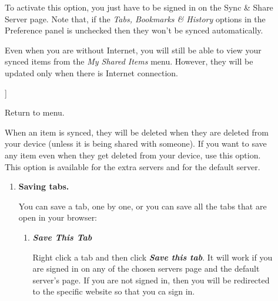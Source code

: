 \documentclass{article}
\begin{document}
					\begin{description}
						\item[ 
							\textbf{\subsubsection*{
							 2.1.Auto Syncing}}
							}
						
							]
								\par To activate this option, you just have to be signed in on the Sync \& Share Server
								page. Note that, if the \emph{Tabs, Bookmarks \& History} options in the
								 Preference  panel is unchecked then they won't be 
								synced automatically. 
								
								\par 
								Even when you are without Internet, you will still be able to view your synced items from the 
								\emph{My Shared Items} menu. However, 
								they will be updated only when there is Internet connection.
								
							
							]
								 
								Return to menu.
							
						\item[
							\textbf{\subsubsection*{
							 2.2.Save manually}}
							}
						
							]
								\par 
								When an item is synced, they will be deleted when they are deleted from your device (unless it is being
								shared with someone). If you want to save any item even when they get deleted from your device, use this
								option. This option is available for the extra servers
								and for the default server.
								
								\begin{enumerate}
									\item 
									\textbf{Saving tabs.}
									\par 
									You can save a tab, one by one, or you can save all the tabs that are open in your browser:
									
										\begin{enumerate}
											\item 
												\textbf{\emph{Save This Tab}}
												\par 
													Right click a tab and then click \textbf{\emph{Save this tab}}.
													It will work if you are signed in on any of the chosen servers page and the default server's
													page. If you are not signed in, then you will be redirected to the specific website so
													that you ca sign in.
												

\end{enumerate}
\end{enumerate}
\end{description}
\end{document}
